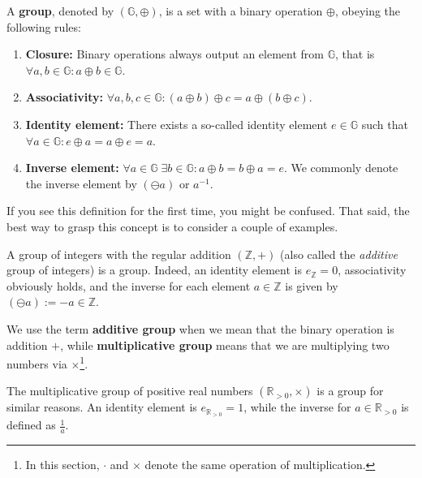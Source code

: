 \documentclass[../../book.tex]{subfiles}
\begin{document}
\begin{definition}
    A \textbf{group}, denoted by $(\mathbb{G}, \oplus)$, is a set with a binary operation $\oplus$, obeying the following rules:
    \begin{enumerate}
        \item \textbf{Closure:} Binary operations always output an element from $\mathbb{G}$, that is $\forall a,b \in \mathbb{G}: a \oplus b \in \mathbb{G}$.
        \item \textbf{Associativity:} $\forall a,b,c \in \mathbb{G}: (a \oplus b)\oplus c = a \oplus (b \oplus c)$.
        \item \textbf{Identity element:} There exists a so-called identity element $e \in \mathbb{G}$ such that $\forall a \in \mathbb{G}: e \oplus a = a \oplus e = a$.
        \item \textbf{Inverse element:} $\forall a \in \mathbb{G} \; \exists b \in \mathbb{G}: a\oplus b = b \oplus a = e$. We commonly denote the inverse element by $(\ominus a)$ or $a^{-1}$.
    \end{enumerate}
\end{definition}

If you see this definition for the first time, you might be confused. 
That said, the best way to grasp this concept is to consider a couple of examples.

\begin{example}
    A group of integers with the regular addition $(\mathbb{Z},+)$ (also called the \textit{additive} group of integers) is a group. Indeed, an identity element is $e_{\mathbb{Z}}=0$, associativity obviously holds, and the inverse for each element $a \in \mathbb{Z}$ is given by $(\ominus a) := -a \in \mathbb{Z}$. 
\end{example}

\begin{remark}
    We use the term \textbf{additive group} when we mean that the binary operation is addition $+$, while \textbf{multiplicative group} means that we are multiplying two numbers via $\times$\footnote{In this section, $\cdot$ and $\times$ denote the same operation of multiplication.}.
\end{remark}

\begin{example}
    The multiplicative group of positive real numbers $(\mathbb{R}_{> 0}, \times)$ is a group for similar reasons. An identity element is $e_{\mathbb{R}_{>0}} = 1$, while the inverse for $a \in \mathbb{R}_{>0}$ is defined as $\frac{1}{a}$.
\end{example}
\end{document}
